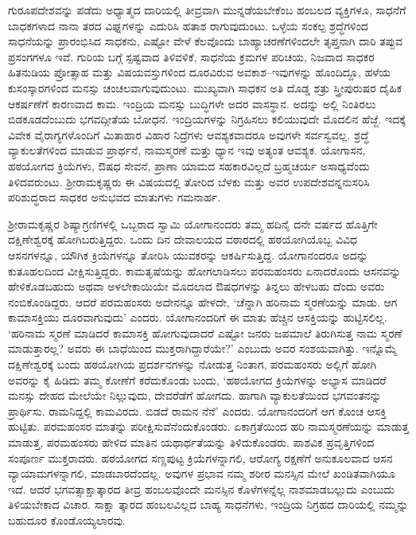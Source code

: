 ಗುರೂಪದೇಶವನ್ನು ಪಡೆದು ಅಧ್ಯಾತ್ಮದ ದಾರಿಯಲ್ಲಿ ತೀವ್ರವಾಗಿ ಮುನ್ನಡೆಯಬೇಕೆಂಬ ಹಂಬಲದ ವ್ಯಕ್ತಿಗಳೂ, ಸಾಧನೆಗೆ ಬಾಧಕಗಳಾದ ನಾನಾ ತರದ ವಿಘ್ನಗಳನ್ನು ಎದುರಿಸಿ ಹತಾಶ ರಾಗುವುದುಂಟು. ಒಳ್ಳೆಯ ಸಂಕಲ್ಪ ಶ್ರದ್ಧೆಗಳಿಂದ ಸಾಧನೆಯನ್ನು ಪ್ರಾರಂಭಿಸಿದ ಸಾಧಕನು, ಎಷ್ಟೋ ವೇಳೆ ಕೆಲವೊಂದು ಬಾಹ್ಯಾಚರಣೆಗಳಿಂದಲೇ ತೃಪ್ತನಾಗಿ ದಾರಿ ತಪ್ಪುವ ಪ್ರಸಂಗಗಳೂ ಇವೆ. ಗುರಿಯ ಬಗ್ಗೆ ಸ್ಪಷ್ಟವಾದ ತಿಳಿವಳಿಕೆ, ಸಾಧನೆಯ ಕ್ರಮಗಳ ಪರಿಚಯ, ನಿಜವಾದ ಸಾಧಕರ ಹಿತನುಡಿಯ ಪ್ರೋತ್ಸಾಹ ಮತ್ತು ವಿಷಯವಸ್ತುಗಳಿಂದ ದೂರವಿರುವ ಅವಕಾಶ–ಇವುಗಳನ್ನು ಹೊಂದಿದ್ದೂ, ಹಳೆಯ ಕುಸಂಸ್ಕಾರಗಳಿಂದ ಮನಸ್ಸು ಚಂಚಲವಾಗುವುದುಂಟು. ಮುಖ್ಯವಾಗಿ ಸಾಧಕನ ಅತಿ ದೊಡ್ಡ ಶತ್ರು ಸ್ತ್ರೀಪುರುಷರ ದೈಹಿಕ ಆಕರ್ಷಣೆಗೆ ಕಾರಣವಾದ ಕಾಮ. ಇಂದ್ರಿಯ ಮನಸ್ಸು ಬುದ್ಧಿಗಳೇ ಅದರ ವಾಸಸ್ಥಾನ. ಅದನ್ನು ಅಲ್ಲಿ ನಿಂತಿರಲು ಬಿಡಕೂಡದೆಂಬುದು ಭಗವದ್ಗೀತೆಯ ಬೋಧನೆ. ಇಂದ್ರಿಯಗಳನ್ನು ನಿಗ್ರಹಿಸಲು ಕಲಿಯುವುದೇ ಮೊದಲಿನ ಹೆಜ್ಜೆ. ಇದಕ್ಕೆ ವಿವೇಕ ವೈರಾಗ್ಯಗಳೊಂದಿಗೆ ಮಿತಾಹಾರ ವಿಹಾರ ನಿದ್ರೆಗಳು ಆವಶ್ಯಕವಾದರೂ ಅವುಗಳೇ ಸರ್ವಸ್ವವಲ್ಲ. ಶ್ರದ್ಧೆ ವ್ಯಾಕುಲತೆಗಳಿಂದ ಮಾಡುವ ಪ್ರಾರ್ಥನೆ, ನಾಮಸ್ಮರಣೆ ಮತ್ತು ಧ್ಯಾನ ಇವು ಅತ್ಯಂತ ಆವಶ್ಯಕ. ಯೋಗಾಸನ, ಹಠಯೋಗದ ಕ್ರಿಯೆಗಳು, ಔಷಧ ಸೇವನೆ, ಪ್ರಾಣಾ ಯಾಮದ ಸಹಕಾರವಿಲ್ಲದೆ ಬ್ರಹ್ಮಚರ್ಯ ಅಸಾಧ್ಯವೆಂದು ತಿಳಿದವರುಂಟು. ಶ‍್ರೀರಾಮಕೃಷ್ಣರು ಈ ವಿಷಯದಲ್ಲಿ ತೋರಿದ ಬೆಳಕು ಮತ್ತು ಅವರ ಉಪದೇಶವನ್ನನುಸರಿಸಿ ಪರಿಶುದ್ಧರಾದ ಸಾಧಕರ ಅನುಭವದ ಮಾತುಗಳು ಗಮನಾರ್ಹ.

ಶ‍್ರೀರಾಮಕೃಷ್ಣರ ಶಿಷ್ಯಾಗ್ರಣಿಗಳಲ್ಲಿ ಒಬ್ಬರಾದ ಸ್ವಾಮಿ ಯೋಗಾನಂದರು ತಮ್ಮ ಹದಿನೈ ದನೇ ವರ್ಷದ ಹೊತ್ತಿಗೇ ದಕ್ಷಿಣೇಶ್ವರಕ್ಕೆ ಹೋಗಿಬರುತ್ತಿದ್ದರು. ಒಂದು ದಿನ ದೇವಾಲಯದ ವಠಾರದಲ್ಲಿ ಹಠಯೋಗಿಯೊಬ್ಬ ವಿವಿಧ ಆಸನಗಳನ್ನೂ, ಯೌಗಿಕ ಕ್ರಿಯೆಗಳನ್ನೂ ತೋರಿಸಿ ಯುವಕರನ್ನು ಆಕರ್ಷಿಸುತ್ತಿದ್ದ. ಯೋಗಾನಂದರೂ ಅದನ್ನು ಕುತೂಹಲದಿಂದ ವೀಕ್ಷಿಸುತ್ತಿದ್ದರು. ಕಾಮತೃಷೆಯನ್ನು ಹೋಗಲಾಡಿಸಲು ಪರಮಹಂಸರು ಏನಾದರೊಂದು ಆಸನವನ್ನು ಹೇಳಿಕೊಡಬಹುದು ಅಥವಾ ಅಳಲೇಕಾಯಿಯೇ ಮೊದಲಾದ ಔಷಧಗಳನ್ನು ತಿನ್ನಲು ಹೇಳಬಹು ದೆಂದು ಅವರು ನಂಬಿಕೊಂಡಿದ್ದರು. ಆದರೆ ಪರಮಹಂಸರು ಅದೇನನ್ನೂ ಹೇಳದೇ, ‘ಚೆನ್ನಾಗಿ ಹರಿನಾಮ ಸ್ಮರಣೆಯನ್ನು ಮಾಡು. ಆಗ ಕಾಮಾಸಕ್ತಿಯು ದೂರವಾಗುವುದು’ ಎಂದರು. ಯೋಗಾನಂದರಿಗೆ ಈ ಮಾತು ಹೆಚ್ಚಿನ ಆಸಕ್ತಿಯನ್ನು ಹುಟ್ಟಿಸಲಿಲ್ಲ. ‘ಹರಿನಾಮ ಸ್ಮರಣೆ ಮಾಡಿದರೆ ಕಾಮಾಸಕ್ತಿ ಹೋಗುವುದಾದರೆ ಎಷ್ಟೋ ಜನರು ಜಪಮಾಲೆ ತಿರುಗಿಸುತ್ತ ನಾಮ ಸ್ಮರಣೆ ಮಾಡುತ್ತಾರಲ್ಲ? ಅವರು ಈ ಬಾಧೆಯಿಂದ ಮುಕ್ತರಾಗಿದ್ದಾರೆಯೇ?’ ಎಂಬುದು ಅವರ ಸಂಶಯವಾಗಿತ್ತು. ಇನ್ನೊಮ್ಮೆ ದಕ್ಷಿಣೇಶ್ವರಕ್ಕೆ ಬಂದು ಹಠಯೋಗಿಯ ಪ್ರದರ್ಶನಗಳನ್ನು ನೋಡುತ್ತ ನಿಂತಾಗ, ಪರಮಹಂಸರು ಅಲ್ಲಿಗೆ ಹೋಗಿ ಅವರನ್ನು ಕೈ ಹಿಡಿದು ತಮ್ಮ ಕೋಣೆಗೆ ಕರೆದುಕೊಂಡು ಬಂದು, ‘ಹಠಯೋಗದ ಕ್ರಿಯೆಗಳನ್ನು ಅಭ್ಯಾಸ ಮಾಡಿದರೆ ಮನಸ್ಸು ದೇಹದ ಮೇಲೆಯೇ ನಿಲ್ಲುವುದು, ದೇವರೆಡೆಗೆ ಹೋಗದು. ಹಾಗಾಗಿ ವ್ಯಾಕುಲತೆಯಿಂದ ಭಗವಂತನನ್ನು ಪ್ರಾರ್ಥಿಸು. ರಾಮನಿದ್ದಲ್ಲಿ ಕಾಮವಿರದು. ಬಿಡದೆ ರಾಮನ ನೆನೆ’ ಎಂದರು. ಯೋಗಾನಂದರಿಗೆ ಆಗ ಕೊಂಚ ಆಸಕ್ತಿ ಹುಟ್ಟಿತು. ಪರಮಹಂಸರ ಮಾತನ್ನು ಪರೀಕ್ಷಿಸುವೆನೆಂದುಕೊಂಡರು. ಏಕಾಗ್ರತೆಯಿಂದ ಹರಿ ನಾಮಸ್ಮರಣೆಯನ್ನು ಮಾಡುತ್ತ ಮಾಡುತ್ತ, ಪರಮಹಂಸರು ಹೇಳಿದ ಮಾತಿನ ಯಥಾರ್ಥತೆಯನ್ನು ತಿಳಿದುಕೊಂಡರು. ಪಾಶವಿಕ ಪ್ರವೃತ್ತಿಗಳಿಂದ ಸಂಪೂರ್ಣ ಮುಕ್ತರಾದರು. ಹಠಯೋಗದ ಸಣ್ಣಪುಟ್ಟ ಕ್ರಿಯೆಗಳನ್ನಾಗಲಿ, ಆರೋಗ್ಯ ರಕ್ಷಣೆಗೆ ಅನುಕೂಲವಾದ ಆಸನ ವ್ಯಾಯಾಮಗಳನ್ನಾಗಲಿ, ಮಾಡಬಾರದೆಂದಲ್ಲ. ಅವುಗಳ ಪ್ರಭಾವ ನಮ್ಮ ಶರೀರ ಮನಸ್ಸಿನ ಮೇಲೆ ಖಂಡಿತವಾಗಿಯೂ ಇದೆ. ಆದರೆ ಭಗವತ್ಸಾಕ್ಷಾತ್ಕಾರದ ತೀವ್ರ ಹಂಬಲವೊಂದೇ ಮನಸ್ಸಿನ ಕೊಳೆಗಳನ್ನೆಲ್ಲ ನಾಶಮಾಡಬಲ್ಲುದು ಎಂಬುದು ತಿಳಿಯಬೇಕಾದ ವಿಚಾರ. ಸಾಕ್ಷಾ ತ್ಕಾರದ ಹಂಬಲವಿಲ್ಲದ ಬಾಹ್ಯ ಸಾಧನೆಗಳು, ಇಂದ್ರಿಯ ನಿಗ್ರಹದ ದಾರಿಯಲ್ಲಿ ನಮ್ಮನ್ನು ಬಹುದೂರ ಕೊಂಡೊಯ್ಯಲಾರವು.

